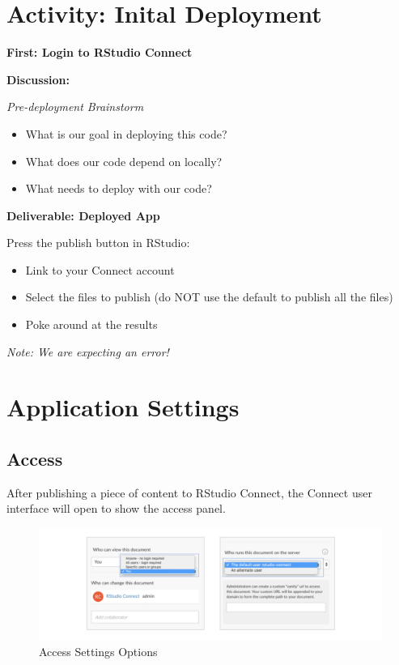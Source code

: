\documentclass[]{book}
\providecommand{\tightlist}{%
  \setlength{\itemsep}{0pt}\setlength{\parskip}{0pt}}
\theoremstyle{definition}
\theoremstyle{definition}
\theoremstyle{definition}
\theoremstyle{remark}
\begin{document}
\hypertarget{activity-inital-deployment}{%
\section{Activity: Inital Deployment}\label{activity-inital-deployment}}

\textbf{First: Login to RStudio Connect}

\textbf{Discussion:}

\emph{Pre-deployment Brainstorm}

\begin{itemize}
\tightlist
\item
  What is our goal in deploying this code?
\item
  What does our code depend on locally?
\item
  What needs to deploy with our code?
\end{itemize}

\textbf{Deliverable: Deployed App}

Press the publish button in RStudio:

\begin{itemize}
\tightlist
\item
  Link to your Connect account
\item
  Select the files to publish (do NOT use the default to publish all the
  files)
\item
  Poke around at the results
\end{itemize}

\emph{Note: We are expecting an error!}

\hypertarget{application-settings}{%
\section{Application Settings}\label{application-settings}}

\hypertarget{access}{%
\subsection{Access}\label{access}}

After publishing a piece of content to RStudio Connect, the Connect user
interface will open to show the access panel.

\begin{figure}
\centering
\includegraphics{imgs/deployment/access-settings.png}
\caption{Access Settings Options}
\end{figure}
\end{document}
